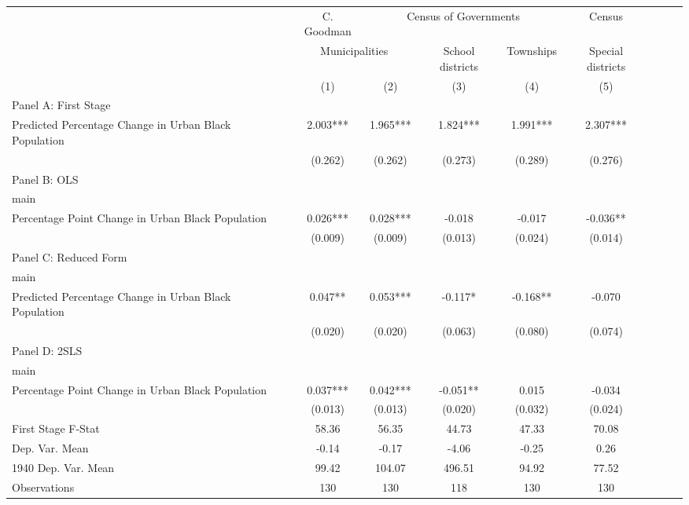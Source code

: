 \begin{tabular}{l*{8}{c}} \toprule
&\multicolumn{1}{c}{C. Goodman}&\multicolumn{3}{c}{Census of Governments}&\multicolumn{1}{c}{Census}\\\cmidrule(lr){2-2}\cmidrule(lr){3-5}\cmidrule(lr){6-6}
&\multicolumn{2}{c}{Municipalities}&\multicolumn{1}{c}{School districts}&\multicolumn{1}{c}{Townships}&\multicolumn{1}{c}{Special districts}&\\\cmidrule(lr){2-3}\cmidrule(lr){4-5}\cmidrule(lr){6-6}
&\multicolumn{1}{c}{(1)}&\multicolumn{1}{c}{(2)}&\multicolumn{1}{c}{(3)}&\multicolumn{1}{c}{(4)}&\multicolumn{1}{c}{(5)}\\
\cmidrule(lr){1-6}
\multicolumn{5}{l}{Panel A: First Stage}\\
\cmidrule(lr){1-6}
Predicted Percentage Change in Urban Black Population&    2.003***&    1.965***&    1.824***&    1.991***&    2.307***\\
                &  (0.262)   &  (0.262)   &  (0.273)   &  (0.289)   &  (0.276)   \\
\cmidrule(lr){1-6}
\multicolumn{5}{l}{Panel B: OLS}\\
\cmidrule(lr){1-6}
main            &            &            &            &            &            \\
Percentage Point Change in Urban Black Population&    0.026***&    0.028***&   -0.018   &   -0.017   &   -0.036** \\
                &  (0.009)   &  (0.009)   &  (0.013)   &  (0.024)   &  (0.014)   \\
\cmidrule(lr){1-6}
\multicolumn{5}{l}{Panel C: Reduced Form}\\
\cmidrule(lr){1-6}
main            &            &            &            &            &            \\
Predicted Percentage Change in Urban Black Population&    0.047** &    0.053***&   -0.117*  &   -0.168** &   -0.070   \\
                &  (0.020)   &  (0.020)   &  (0.063)   &  (0.080)   &  (0.074)   \\
\cmidrule(lr){1-6}
\multicolumn{5}{l}{Panel D: 2SLS}\\
\cmidrule(lr){1-6}
main            &            &            &            &            &            \\
Percentage Point Change in Urban Black Population&    0.037***&    0.042***&   -0.051** &    0.015   &   -0.034   \\
                &  (0.013)   &  (0.013)   &  (0.020)   &  (0.032)   &  (0.024)   \\
\midrule
First Stage F-Stat&    58.36   &    56.35   &    44.73   &    47.33   &    70.08   \\
Dep. Var. Mean  &    -0.14   &    -0.17   &    -4.06   &    -0.25   &     0.26   \\
1940 Dep. Var. Mean&    99.42   &   104.07   &   496.51   &    94.92   &    77.52   \\
Observations    &      130   &      130   &      118   &      130   &      130   \\
 \bottomrule \end{tabular}
